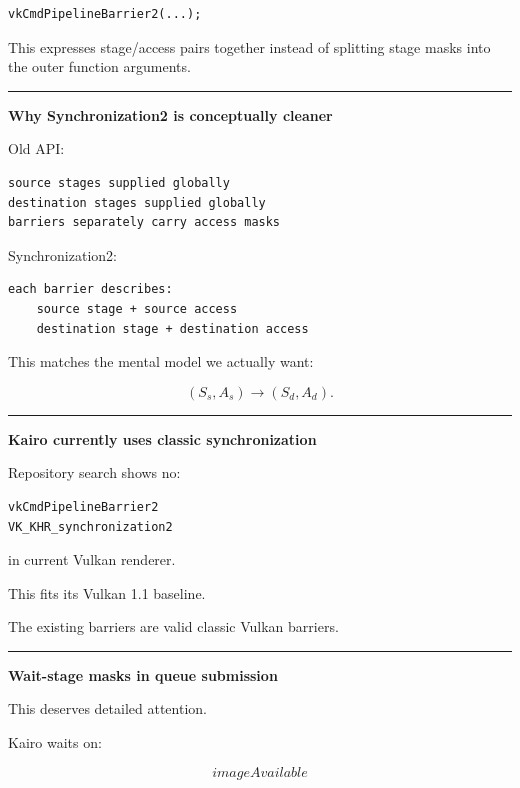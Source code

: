 \begin{verbatim}
vkCmdPipelineBarrier2(...);
\end{verbatim}

This expresses stage/access pairs together instead of splitting stage masks into the outer function arguments.

\begin{center}\rule{0.5\linewidth}{0.5pt}\end{center}

\textbf{Why Synchronization2 is conceptually cleaner}

Old API:

\begin{verbatim}
source stages supplied globally
destination stages supplied globally
barriers separately carry access masks
\end{verbatim}

Synchronization2:

\begin{verbatim}
each barrier describes:
    source stage + source access
    destination stage + destination access
\end{verbatim}

This matches the mental model we actually want:

\[
(S_s,A_s)\rightarrow(S_d,A_d).
\]

\begin{center}\rule{0.5\linewidth}{0.5pt}\end{center}

\textbf{Kairo currently uses classic synchronization}

Repository search shows no:

\begin{verbatim}
vkCmdPipelineBarrier2
VK_KHR_synchronization2
\end{verbatim}

in current Vulkan renderer.

This fits its Vulkan 1.1 baseline.

The existing barriers are valid classic Vulkan barriers.

\begin{center}\rule{0.5\linewidth}{0.5pt}\end{center}

\textbf{Wait-stage masks in queue submission}

This deserves detailed attention.

Kairo waits on:

\[
imageAvailable
\]

